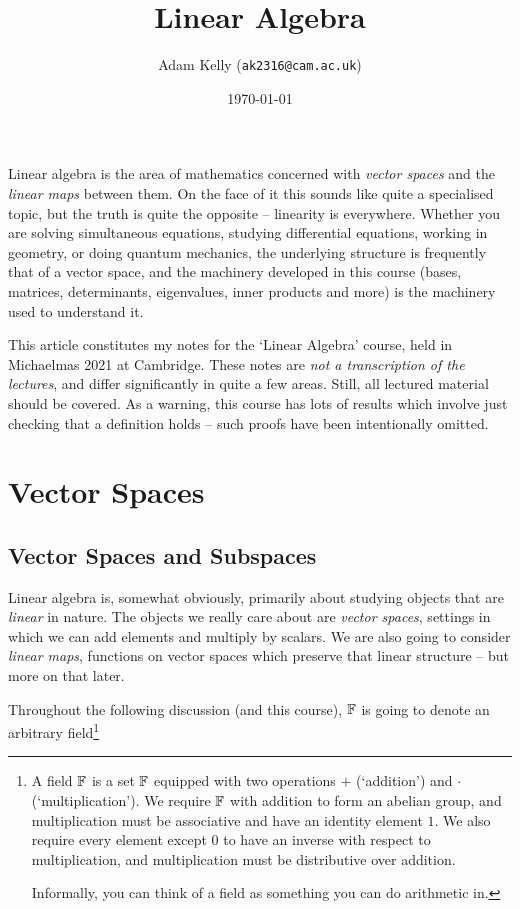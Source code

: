 \documentclass[a4paper]{scrartcl}
\title{Linear Algebra}
\author{Adam Kelly (\texttt{ak2316@cam.ac.uk})}
\date{\today}
\begin{document}
\maketitle

Linear algebra is the area of mathematics concerned with \emph{vector spaces} and the \emph{linear maps} between them. On the face of it this sounds like quite a specialised topic, but the truth is quite the opposite -- linearity is everywhere. Whether you are solving simultaneous equations, studying differential equations, working in geometry, or doing quantum mechanics, the underlying structure is frequently that of a vector space, and the machinery developed in this course (bases, matrices, determinants, eigenvalues, inner products and more) is the machinery used to understand it.

This article constitutes my notes for the `Linear Algebra' course, held in Michaelmas 2021 at Cambridge. These notes are \emph{not a transcription of the lectures}, and differ significantly in quite a few areas. Still, all lectured material should be covered. As a warning, this course has lots of results which involve just checking that a definition holds -- such proofs have been intentionally omitted.


\tableofcontents

\section{Vector Spaces}

\subsection{Vector Spaces and Subspaces}

Linear algebra is, somewhat obviously, primarily about studying objects that are \emph{linear} in nature. The objects we really care about are \emph{vector spaces}, settings in which we can add elements and multiply by scalars. We are also going to consider \emph{linear maps}, functions on vector spaces which preserve that linear structure -- but more on that later. 

Throughout the following discussion (and this course), $\mathbb{F}$ is going to denote an arbitrary field\footnote{A field $\mathbb{F}$ is a set $\mathbb{F}$ equipped with two operations $+$ (`addition') and $\cdot$ (`multiplication'). We require $\mathbb{F}$ with addition to form an abelian group, and multiplication must be associative and have an identity element $1$. We also require every element except $0$ to have an inverse with respect to multiplication, and multiplication must be distributive over addition.

Informally, you can think of a field as something you can do arithmetic in.}
\end{document}
